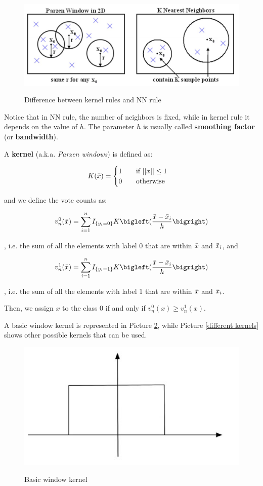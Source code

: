 \begin{figure}[h!]
		\centering
        \includegraphics[scale = 1.0]{img/kernel rules.jpg}
		\label{mi}
        \caption{Difference between kernel rules and NN rule}
\end{figure}

Notice that in NN rule, the number of neighbors is fixed, while in kernel rule it depends on the value of $h$. The parameter $h$ is usually called \textbf{smoothing factor} (or \textbf{bandwidth}).

A \textbf{kernel} (a.k.a. \textit{Parzen windows}) is defined as:

$$
K(\Bar{x}) = \begin{cases}
    1 \qquad \text{if } ||\Bar{x}|| \leq 1 \\
    0 \qquad \text{otherwise}
\end{cases}
$$

and we define the vote counts as:

$$
v_n^0(\Bar{x}) = \sum_{i = 1}^n I_{\{ y_i = 0 \}} K \bigleft( \frac{\Bar{x} - \Bar{x}_i}{h} \bigright)
$$

, i.e. the sum of all the elements with label 0 that are within $\Bar{x}$ and $\Bar{x}_i$, and

$$
v_n^1(\Bar{x}) = \sum_{i = 1}^n I_{\{ y_i = 1 \}} K \bigleft( \frac{\Bar{x} - \Bar{x}_i}{h} \bigright)
$$

, i.e. the sum of all the elements with label 1 that are within $\Bar{x}$ and $\Bar{x}_i$.

Then, we assign $x$ to the class 0 if and only if $v_n^0(x) \geq v_n^1(x)$. 

A basic window kernel is represented in Picture \ref{basic kernel}, while Picture \ref{different kernels} shows other possible kernels that can be used.

\begin{figure}[h!]
		\centering
        \includegraphics[scale = 1.0]{img/basic window kernel.jpg}
		\label{basic kernel}
        \caption{Basic window kernel}
\end{figure}

